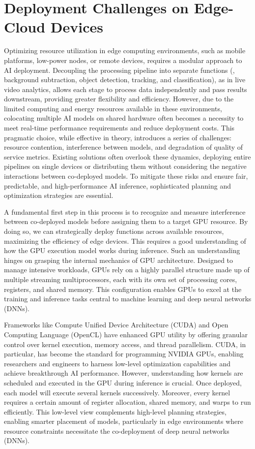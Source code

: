 \section{Deployment Challenges on Edge-Cloud Devices}

Optimizing resource utilization in edge computing environments, such as mobile platforms, low-power nodes, or remote devices, requires a modular approach to AI deployment. Decoupling the processing pipeline into separate functions (\eg, background subtraction, object detection, tracking, and classification), as in live video analytics, allows each stage to process data independently and pass results downstream, providing greater flexibility and efficiency. However, due to the limited computing and energy resources available in these environments, colocating multiple AI models on shared hardware often becomes a necessity to meet real-time performance requirements and reduce deployment costs. This pragmatic choice, while effective in theory, introduces a series of challenges: resource contention, interference between models, and degradation of quality of service metrics. Existing solutions often overlook these dynamics, deploying entire pipelines on single devices or distributing them without considering the negative interactions between co-deployed models. To mitigate these risks and ensure fair, predictable, and high-performance AI inference, sophisticated planning and optimization strategies are essential.

A fundamental first step in this process is to recognize and measure interference between co-deployed models before assigning them to a target GPU resource. By doing so, we can strategically deploy functions across available resources, maximizing the efficiency of edge devices. This requires a good understanding of how the GPU execution model works during inference. Such an understanding hinges on grasping the internal mechanics of GPU architecture. Designed to manage intensive workloads, GPUs rely on a highly parallel structure made up of multiple streaming multiprocessors, each with its own set of processing cores, registers, and shared memory. This configuration enables GPUs to excel at the training and inference tasks central to machine learning and deep neural networks (DNNs).

Frameworks like Compute Unified Device Architecture (CUDA) and Open Computing Language (OpenCL) have enhanced GPU utility by offering granular control over kernel execution, memory access, and thread parallelism. CUDA, in particular, has become the standard for programming NVIDIA GPUs, enabling researchers and engineers to harness low-level optimization capabilities and achieve breakthrough AI performance. However, understanding how kernels are scheduled and executed in the GPU during inference is crucial. Once deployed, each model will execute several kernels successively. Moreover, every kernel requires a certain amount of register allocation, shared memory, and warps to run efficiently. This low-level view complements high-level planning strategies, enabling smarter placement of models, particularly in edge environments where resource constraints necessitate the co-deployment of deep neural networks (DNNs).



